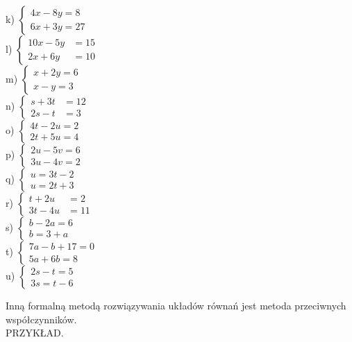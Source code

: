 \documentclass[10pt]{article}
\begin{document}
k) \(\left\{\begin{array}{l}4 x-8 y=8 \\ 6 x+3 y=27\end{array}\right.\)\\
l) \(\left\{\begin{aligned} 10 x-5 y & =15 \\ 2 x+6 y & =10\end{aligned}\right.\)\\
m) \(\left\{\begin{array}{l}x+2 y=6 \\ x-y=3\end{array}\right.\)\\
n) \(\left\{\begin{aligned} s+3 t & =12 \\ 2 s-t & =3\end{aligned}\right.\)\\
o) \(\left\{\begin{array}{l}4 t-2 u=2 \\ 2 t+5 u=4\end{array}\right.\)\\
p) \(\left\{\begin{array}{l}2 u-5 v=6 \\ 3 u-4 v=2\end{array}\right.\)\\
q) \(\left\{\begin{array}{l}u=3 t-2 \\ u=2 t+3\end{array}\right.\)\\
r) \(\left\{\begin{aligned} t+2 u & =2 \\ 3 t-4 u & =11\end{aligned}\right.\)\\
s) \(\left\{\begin{array}{l}b-2 a=6 \\ b=3+a\end{array}\right.\)\\
t) \(\left\{\begin{array}{l}7 a-b+17=0 \\ 5 a+6 b=8\end{array}\right.\)\\
u) \(\left\{\begin{array}{l}2 s-t=5 \\ 3 s=t-6\end{array}\right.\)

Inną formalną metodą rozwiązywania układów równań jest metoda przeciwnych współczynników.\\
PRZYKŁAD.
\end{document}
